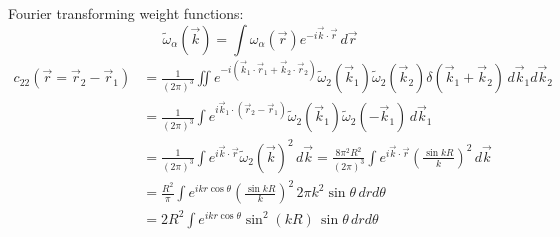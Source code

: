 \documentclass[11pt]{report}
\begin{document}
Fourier transforming weight functions:
\begin{equation}
  \widetilde{\omega}_\alpha(\vec{k}) =
  \int \omega_\alpha (\vec{r}) e^{-i \vec{k}\cdot\vec{r}} \, d\vec{r}
\end{equation}
\begin{equation}
  \begin{aligned}
    c_{22}(\vec{r} = \vec{r}_2 - \vec{r}_1) &=
    \frac{1}{(2\pi)^3}
    \iint
    e^{-i (\vec{k}_1\cdot\vec{r}_1 + \vec{k}_2\cdot\vec{r}_2)}
    \widetilde{\omega}_2(\vec{k}_1)
    \widetilde{\omega}_2(\vec{k}_2)
    \delta{(\vec{k}_1 + \vec{k}_2)}
    \, d\vec{k}_1 d\vec{k}_2 \\
    &=
    \frac{1}{(2\pi)^3}
    \int
    e^{i \vec{k}_1 \cdot (\vec{r}_2 - \vec{r}_1)}
    \widetilde{\omega}_2(\vec{k}_1)
    \widetilde{\omega}_2(-\vec{k}_1)
    \, d\vec{k}_1 \\
    &=
    \frac{1}{(2\pi)^3}
    \int
    e^{i \vec{k} \cdot \vec{r}}
    \widetilde{\omega}_2(\vec{k})^2
    \, d\vec{k}
    =
    \frac{8\pi^2 R^2}{(2\pi)^3}
    \int
    e^{i \vec{k} \cdot \vec{r}}
    \left( \frac{\sin{kR}}{k} \right)^2
    \, d\vec{k} \\
    &=
    \frac{R^2}{\pi}
    \int
    e^{i k r \cos\theta}
    \left( \frac{\sin{kR}}{k} \right)^2
    \, 2\pi k^2 \sin\theta \, dr d\theta \\
    &=
    2 R^2
    \int
    e^{i k r \cos\theta}
    \sin^2{(kR)}
    \, \sin\theta \, dr d\theta
  \end{aligned}
\end{equation}
\end{document}

